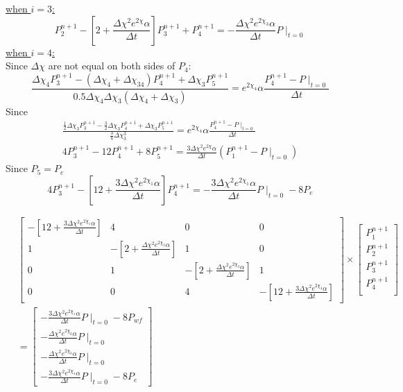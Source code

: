 \documentclass[12pt,letterpaper,titlepage]{article}
\begin{document}
 \underline{when $i=3$:}
\begin{equation}\label{eq:i3}
{P^{n+1}_2-[2+\frac{\Delta\chi^2e^{2\chi}\alpha}{\Delta t}]P^{n+1}_{3}+P^{n+1}_{4}} =-\frac{\Delta\chi^2e^{2\chi_3}\alpha}{\Delta t} P\mid_{t=0}
\end{equation}
 \underline{when $i=4$:}\\
Since $\Delta\chi$ are not equal on both sides of $P_4$:
\begin{equation}
\frac{\Delta\chi_4P^{n+1}_3-(\Delta\chi_4+\Delta\chi_34)P^{n+1}_4+\Delta\chi_3P^{n+1}_5}{0.5\Delta\chi_4\Delta\chi_3(\Delta\chi_4+\Delta\chi_3)}= e^{2\chi_4}\alpha \frac{P^{n+1}_4-P\mid_{t=0}}{\Delta t}\end{equation}
Since 
\begin{gather*}
\frac{\frac{1}{2}\Delta\chi_3P^{n+1}_3-\frac{3}{2}\Delta\chi_3P^{n+1}_4+\Delta\chi_3P^{n+1}_5}{\frac{3}{8}\Delta\chi_3^3}= e^{2\chi_4}\alpha \frac{P^{n+1}_4-P\mid_{t=0}}{\Delta t}\\
4  P^{n+1}_3 -12 P^{n+1}_4 + 8 P^{n+1}_5= \frac{3\Delta\chi^2 e^{2\chi}\alpha}{\Delta t} (P^{n+1}_1-P\mid_{t=0})
\end{gather*}
Since $P_5=P_{e}$ 
\begin{equation}\label{eq:i4}
4 P^{n+1}_3-[12+\frac{3\Delta\chi^2 e^{2\chi_1}\alpha}{\Delta t}]P^{n+1}_4 = -\frac{3\Delta\chi^2 e^{2\chi_1}\alpha}{\Delta t}P\mid_{t=0}-8  P_{e} 
\end{equation}

\renewcommand{\arraystretch}{2}
 \[ \begin{aligned}
    & \begin{bmatrix} 
     -[12+\frac{3\Delta\chi^2 e^{2\chi_1}\alpha}{\Delta t}] & 4 & 0 & 0 \\ 
     1 & -[2+\frac{\Delta\chi^2 e^{2\chi_2}\alpha}{\Delta t}] & 1 & 0 \\
        0 &  1 & -[2+\frac{\Delta\chi^2 e^{2\chi_3}\alpha}{\Delta t}] & 1 \\
       0&0&4& -[12+\frac{3\Delta\chi^2 e^{2\chi_4}\alpha}{\Delta t}]
 \end{bmatrix} 
  \times \begin{bmatrix} 
      P^{n+1}_1        \\ 
      P^{n+1}_2        \\ 
      P^{n+1}_3        \\ 
      P^{n+1}_4        \\ 
    \end{bmatrix} \\&= \left[\begin{array}{l}  -\frac{3\Delta\chi^2 e^{2\chi_1}\alpha}{\Delta t}P\mid_{t=0}-8  P_{wf}\\-\frac{\Delta\chi^2e^{2\chi_2}\alpha}{\Delta t} P\mid_{t=0}\\-\frac{\Delta\chi^2e^{2\chi_3}\alpha}{\Delta t} P\mid_{t=0}\\ -\frac{3\Delta\chi^2 e^{2\chi_4}\alpha}{\Delta t}P\mid_{t=0}-8  P_{e}  \end{array}\right]
\end{aligned}  \] 
\end{document}
